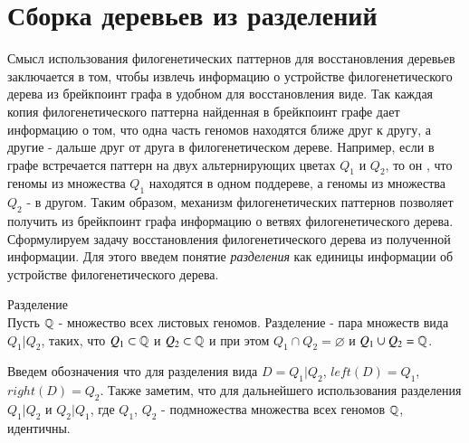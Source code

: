 \section{Сборка деревьев из разделений}
Смысл использования филогенетических паттернов для восстановления деревьев заключается в том,
чтобы извлечь информацию о устройстве филогенетического дерева из брейкпоинт графа в удобном для восстановления виде.
Так каждая копия филогенетического паттерна найденная в брейкпоинт графе дает информацию о том,
что одна часть геномов находятся ближе друг к другу, а другие - дальше друг от друга в филогенетическом дереве.
Например, если в графе встречается паттерн  на двух альтернирующих цветах $Q_1$ и $Q_2$, то он ,
что геномы из множества $Q_1$ находятся в одном поддереве, а геномы из множества $Q_2$ - в другом.
Таким образом, механизм филогенетических паттернов позволяет получить из брейкпоинт графа информацию о ветвях филогенетического дерева.
Сформулируем задачу восстановления филогенетического дерева из полученной информации.
Для этого введем понятие \textit{разделения} как единицы информации об устройстве филогенетического дерева.
\begin{define}{Разделение} \\
  Пусть $\mathbb{Q}$ - множество всех листовых геномов.
  Разделение - пара множеств вида $Q_1|Q_2$, таких, что $Q_1 \subset \mathbb{Q}$ и $Q_2 \subset \mathbb{Q}$ и при этом
  $Q_1 \cap Q_2 = \varnothing$ и $Q_1 \cup Q_2 = \mathbb{Q}$.
\end{define}
Введем обозначения что для разделения вида $D = Q_1|Q_2$, $left(D) = Q_1$, $right(D) = Q_2$.
Также заметим, что для дальнейшего использования разделения $Q_1|Q_2$ и $Q_2|Q_1$,
где $Q_1$, $Q_2$ - подмножества множества всех геномов $\mathbb{Q}$, идентичны.

